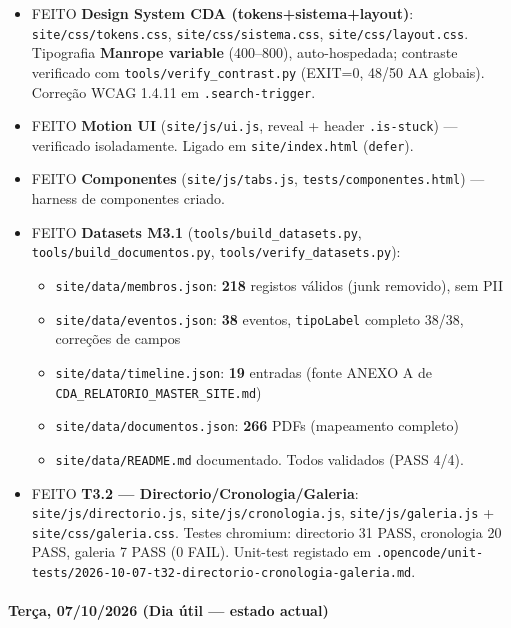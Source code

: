 \begin{itemize}
\tightlist
\item
  {FEITO} \textbf{Design System CDA (tokens+sistema+layout)}:
  \texttt{site/css/tokens.css}, \texttt{site/css/sistema.css},
  \texttt{site/css/layout.css}. Tipografia \textbf{Manrope variable}
  (400--800), auto-hospedada; contraste verificado com
  \texttt{tools/verify\_contrast.py} (EXIT=0, 48/50 AA globais).
  Correção WCAG 1.4.11 em \texttt{.search-trigger}.
\item
  {FEITO} \textbf{Motion UI} (\texttt{site/js/ui.js}, reveal + header
  \texttt{.is-stuck}) --- verificado isoladamente. Ligado em
  \texttt{site/index.html} (\texttt{defer}).
\item
  {FEITO} \textbf{Componentes} (\texttt{site/js/tabs.js},
  \texttt{tests/componentes.html}) --- harness de componentes criado.
\item
  {FEITO} \textbf{Datasets M3.1} (\texttt{tools/build\_datasets.py},
  \texttt{tools/build\_documentos.py},
  \texttt{tools/verify\_datasets.py}):

  \begin{itemize}
  \tightlist
  \item
    \texttt{site/data/membros.json}: \textbf{218} registos válidos (junk
    removido), sem PII
  \item
    \texttt{site/data/eventos.json}: \textbf{38} eventos,
    \texttt{tipoLabel} completo 38/38, correções de campos
  \item
    \texttt{site/data/timeline.json}: \textbf{19} entradas (fonte ANEXO
    A de \texttt{CDA\_RELATORIO\_MASTER\_SITE.md})
  \item
    \texttt{site/data/documentos.json}: \textbf{266} PDFs (mapeamento
    completo)
  \item
    \texttt{site/data/README.md} documentado. Todos validados (PASS
    4/4).
  \end{itemize}
\item
  {FEITO} \textbf{T3.2 --- Directorio/Cronologia/Galeria}:
  \texttt{site/js/directorio.js}, \texttt{site/js/cronologia.js},
  \texttt{site/js/galeria.js} + \texttt{site/css/galeria.css}. Testes
  chromium: directorio 31 PASS, cronologia 20 PASS, galeria 7 PASS (0
  FAIL). Unit-test registado em
  \texttt{.opencode/unit-tests/2026-10-07-t32-directorio-cronologia-galeria.md}.
\end{itemize}

\paragraph{Terça, 07/10/2026 (Dia útil --- estado
actual)}\label{teruxe7a-07102026-dia-uxfatil-estado-actual}

